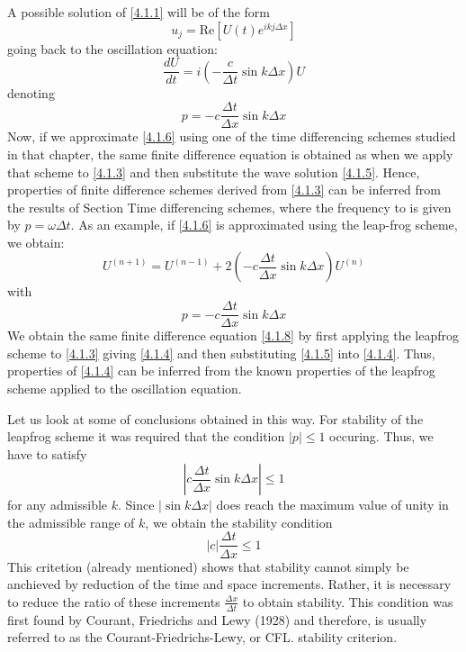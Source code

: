 A possible solution of \ref{4.1.1} will be of the form
\begin{equation}\label{4.1.5}
	u_j=\text{Re}\left[U(t)e^{ikj\Delta x}\right]
\end{equation}
going back to the oscillation equation:
\begin{equation}\label{4.1.6}
	\frac{dU}{dt}=i\left(-\frac{c}{\Delta t}\sin k\Delta x\right)U
\end{equation}
denoting
$$p=-c\frac{\Delta t}{\Delta x}\sin k\Delta x$$
Now, if we approximate \ref{4.1.6} using one of the time differencing schemes studied in that chapter, the same finite difference equation is obtained as when we apply that scheme to \ref{4.1.3} and then substitute the wave solution \ref{4.1.5}. Hence, properties of finite difference schemes derived from \ref{4.1.3} can be inferred from the results of Section Time differencing schemes, where the frequency to is given by $p=\omega\Delta t$.
As an example, if \ref{4.1.6} is approximated using the leap-frog scheme, we obtain:
\begin{equation}\label{4.1.8}
	U^{(n+1)}=U^{(n-1)}+2\left(-c\frac{\Delta t}{\Delta x}\sin k\Delta x\right)U^{(n)}
\end{equation}
with
\begin{equation}\label{4.1.9}
	p=-c\frac{\Delta t}{\Delta x}\sin k\Delta x
\end{equation}
We obtain the same finite difference equation \ref{4.1.8} by first applying the leapfrog scheme to \ref{4.1.3} giving \ref{4.1.4} and then substituting \ref{4.1.5} into \ref{4.1.4}. Thus, properties of \ref{4.1.4} can be inferred from the known properties of the leapfrog scheme applied to the oscillation equation.

Let us look at some of conclusions obtained in this way. For stability of the leapfrog scheme it was required that the condition $|p|\leq 1$ occuring. Thus, we have to satisfy
\begin{equation}
	\left|c\frac{\Delta t}{\Delta x}\sin k\Delta x\right|\leq 1
\end{equation}
for any admissible $k$. Since $|\sin k\Delta x|$ does reach the maximum value of unity in the admissible range of $k$, we obtain the stability condition
\begin{equation}\label{4.1.10}
	|c|\frac{\Delta t}{\Delta x}\leq 1
\end{equation}
This critetion (already mentioned) shows that stability cannot simply be anchieved by reduction of the time and space increments. Rather, it is necessary to reduce the ratio of these increments $\frac{\Delta x}{\Delta t}$ to obtain stability. This condition was first found by Courant, Friedrichs and Lewy (1928) and therefore, is usually referred to as the Courant-Friedrichs-Lewy, or CFL. stability criterion.


